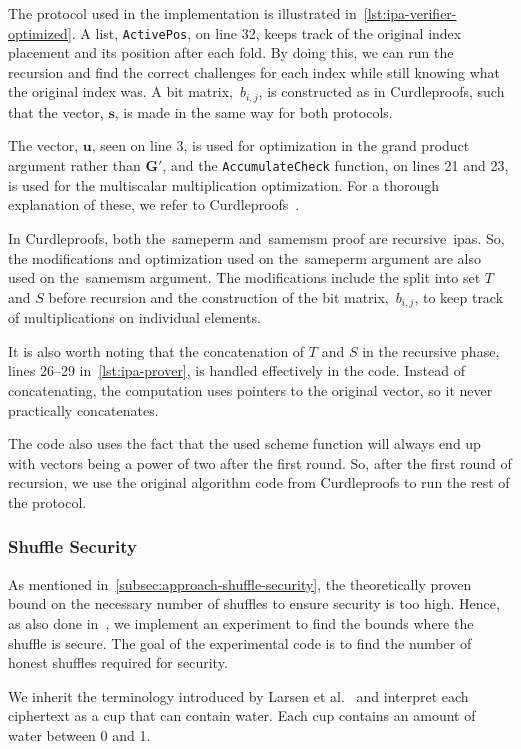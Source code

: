 The protocol used in the implementation is illustrated in~\autoref{lst:ipa-verifier-optimized}.
A list, \texttt{ActivePos}, on line 32, keeps track of the original index placement and its position after each fold.
By doing this, we can run the recursion and find the correct challenges for each index while still knowing what the original index was.
A bit matrix,~$b_{i,j}$, is constructed as in Curdleproofs, such that the vector, $\mathbf{s}$, is made in the same way for both protocols.

The vector, $\mathbf{u}$, seen on line 3, is used for optimization in the grand product argument rather than $\mathbf{G'}$, and the \texttt{AccumulateCheck} function, on lines 21 and 23, is used for the multiscalar multiplication optimization.
For a thorough explanation of these, we refer to Curdleproofs~\cite{Curdleproofs}.

In Curdleproofs, both the~\gls{sameperm} and~\gls{samemsm} proof are recursive~\glspl{ipa}.
So, the modifications and optimization used on the~\gls{sameperm} argument are also used on the~\gls{samemsm} argument.
The modifications include the split into set $T$ and $S$ before recursion and the construction of the bit matrix,~$b_{i,j}$, to keep track of multiplications on individual elements.

It is also worth noting that the concatenation of $T$ and $S$ in the recursive phase, lines 26--29 in~\autoref{lst:ipa-prover}, is handled effectively in the code.
Instead of concatenating, the computation uses pointers to the original vector, so it never practically concatenates.

The code also uses the fact that the used scheme function will always end up with vectors being a power of two after the first round.
So, after the first round of recursion, we use the original algorithm code from Curdleproofs to run the rest of the protocol.

\subsubsection{Shuffle Security}
As mentioned in~\autoref{subsec:approach-shuffle-security}, the theoretically proven bound on the necessary number of shuffles to ensure security is too high.
Hence, as also done in~\cite{cryptoeprint:2022/560}, we implement an experiment to find the bounds where the shuffle is secure.
The goal of the experimental code is to find the number of honest shuffles required for security.

We inherit the terminology introduced by Larsen et al.~\cite{cryptoeprint:2022/560} and interpret each ciphertext as a cup that can contain water.
Each cup contains an amount of water between 0 and 1.

